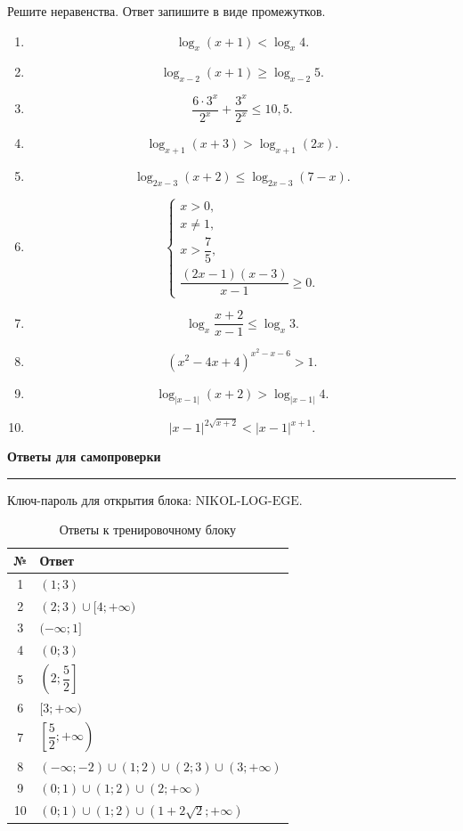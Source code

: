 \documentclass[a4paper,12pt]{article}
\newcommand{\SectionTitle}[1]{%
  \vspace{0.8em}
  {\Large\bfseries\textcolor{darkaccent}{#1}}\par
  \vspace{0.2em}
  {\color{accent}\rule{\linewidth}{0.8pt}}
  \vspace{0.4em}
}
\begin{document}
Решите неравенства. Ответ запишите в виде промежутков.

\begin{enumerate}[label=\textbf{\arabic*.}]
\item
\[
\log_x(x+1)<\log_x4.
\]

\item
\[
\log_{x-2}(x+1)\ge\log_{x-2}5.
\]

\item
\[
\frac{6\cdot3^x}{2^x}+\frac{3^x}{2^x}\le10{,}5.
\]

\item
\[
\log_{x+1}(x+3)>\log_{x+1}(2x).
\]

\item
\[
\log_{2x-3}(x+2)\le\log_{2x-3}(7-x).
\]

\item
\[
\begin{cases}
x>0,\\
x\ne1,\\
x>\dfrac75,\\
\dfrac{(2x-1)(x-3)}{x-1}\ge0.
\end{cases}
\]

\item
\[
\log_x\dfrac{x+2}{x-1}\le\log_x3.
\]

\item
\[
(x^2-4x+4)^{x^2-x-6}>1.
\]

\item
\[
\log_{|x-1|}(x+2)>\log_{|x-1|}4.
\]

\item
\[
|x-1|^{2\sqrt{x+2}}<|x-1|^{x+1}.
\]
\end{enumerate}

\newpage

\SectionTitle{Ответы для самопроверки}

\textcolor{muted}{Ключ-пароль для открытия блока: \(\text{NIKOL-LOG-EGE}\).}

\vspace{0.6em}

\renewcommand{\arraystretch}{1.45}
\begin{table}[h]
\centering
\caption{Ответы к тренировочному блоку}
\begin{tabularx}{\linewidth}{@{}cX@{}}
\toprule
\textbf{№} & \textbf{Ответ} \\
\midrule
1 & \((1;3)\) \\
2 & \((2;3)\cup[4;+\infty)\) \\
3 & \((-\infty;1]\) \\
4 & \((0;3)\) \\
5 & \(\left(2;\dfrac52\right]\) \\
6 & \([3;+\infty)\) \\
7 & \(\left[\dfrac52;+\infty\right)\) \\
8 & \((-\infty;-2)\cup(1;2)\cup(2;3)\cup(3;+\infty)\) \\
9 & \((0;1)\cup(1;2)\cup(2;+\infty)\) \\
10 & \((0;1)\cup(1;2)\cup(1+2\sqrt2;+\infty)\) \\
\bottomrule
\end{tabularx}
\end{table}
\end{document}
